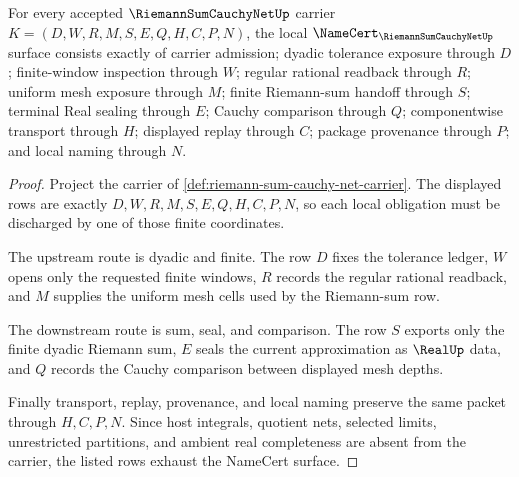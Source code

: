 \begin{theorem}
\label{thm:riemann-sum-cauchy-net-namecert-obligations}
For every accepted $\RiemannSumCauchyNetUp$ carrier $K=(D,W,R,M,S,E,Q,H,C,P,N)$, the local $\NameCert_{\RiemannSumCauchyNetUp}$ surface consists exactly of carrier admission; dyadic tolerance exposure through $D$; finite-window inspection through $W$; regular rational readback through $R$; uniform mesh exposure through $M$; finite Riemann-sum handoff through $S$; terminal Real sealing through $E$; Cauchy comparison through $Q$; componentwise transport through $H$; displayed replay through $C$; package provenance through $P$; and local naming through $N$.
\end{theorem}
\begin{proof}
Project the carrier of \autoref{def:riemann-sum-cauchy-net-carrier}. The displayed rows are exactly $D,W,R,M,S,E,Q,H,C,P,N$, so each local obligation must be discharged by one of those finite coordinates.

The upstream route is dyadic and finite. The row $D$ fixes the tolerance ledger, $W$ opens only the requested finite windows, $R$ records the regular rational readback, and $M$ supplies the uniform mesh cells used by the Riemann-sum row.

The downstream route is sum, seal, and comparison. The row $S$ exports only the finite dyadic Riemann sum, $E$ seals the current approximation as $\RealUp$ data, and $Q$ records the Cauchy comparison between displayed mesh depths.

Finally transport, replay, provenance, and local naming preserve the same packet through $H,C,P,N$. Since host integrals, quotient nets, selected limits, unrestricted partitions, and ambient real completeness are absent from the carrier, the listed rows exhaust the NameCert surface.
\end{proof}

